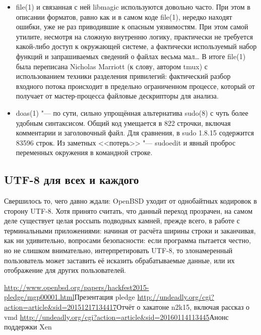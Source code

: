 \documentclass[10pt, a5paper]{article}
\begin{document}
\begin{itemize}
  \item file(1) и связанная с ней libmagic используются довольно часто. При этом в описании форматов, равно как и в самом коде file(1), нередко находят ошибки, уже не раз приводившие к опасным уязвимостям. При этом самой утилите, несмотря на сложную внутренню логику, практически не требуется какой-либо доступ к окружающей системе, а фактически используемый набор функций и запрашиваемых сведений о файлах весьма мал\ldots{} В итоге file(1) была переписана Nicholas Marriott (к слову, автором tmux) с использованием техники разделения привилегий: фактический разбор входного потока происходит в предельно ограниченном процессе, который от получает от мастер-процесса файловые дескрипторы для анализа.

  \item doas(1) "--- по сути, сильно упрощённая альтернатива sudo(8) с чуть более удобным синтаксисом. Общий код умещается в 822 строчки, включая комментарии и заголовочный файл. Для сравнения, в sudo 1.8.15 содержится 83596 строк. Из заметных <<потерь>> "--- sudoedit и явный проброс переменных окружения в командной строке.
\end{itemize}

\subsection*{UTF-8 для всех и каждого}

Свершилось то, чего давно ждали: OpenBSD уходит от однобайтных кодировок в сторону UTF-8. Хотя принято считать, что данный переход прозрачен, на самом деле существует целая россыпь подводных камней, прежде всего, в работе с терминальными приложениями: начиная от расчёта ширины строки и заканчивая, как ни удивительно, вопросами безопасности: если программа пытается честно, но не слишком внимательно, интерпретировать UTF-8, то злонамеренный пользователь может заставить её исказить обрабатываемые данные, или их отображение для других пользователей.

\begin{thebibliography}{99}
   \url{http://www.openbsd.org/papers/hackfest2015-pledge/mgp00001.html}{Презентация pledge}
   \url{http://undeadly.org/cgi?action=article&sid=20151217134417}{Отчёт о хакатоне n2k15, включая рассказ о vmd}
   \url{http://undeadly.org/cgi?action=article&sid=20160114113445}{Анонс поддержки Xen}
\end{thebibliography}
\end{document}
